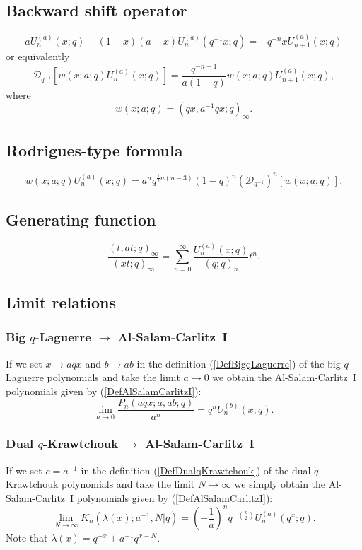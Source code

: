 \documentclass[envcountchap,graybox]{svmono}
\begin{document}
\subsection*{Backward shift operator}
\begin{equation}
\label{shift2AlSalamCarlitzI-I}
aU_n^{(a)}(x;q)-(1-x)(a-x)U_n^{(a)}(q^{-1}x;q)=-q^{-n}xU_{n+1}^{(a)}(x;q)
\end{equation}
or equivalently
\begin{equation}
\label{shift2AlSalamCarlitzI-II}
\mathcal{D}_{q^{-1}}\left[w(x;a;q)U_n^{(a)}(x;q)\right]=
\frac{q^{-n+1}}{a(1-q)}w(x;a;q)U_{n+1}^{(a)}(x;q),
\end{equation}
where
$$w(x;a;q)=(qx,a^{-1}qx;q)_{\infty}.$$

\subsection*{Rodrigues-type formula}
\begin{equation}
\label{RodAlSalamCarlitzI}
w(x;a;q)U_n^{(a)}(x;q)=a^nq^{\frac{1}{2}n(n-3)}(1-q)^n
\left(\mathcal{D}_{q^{-1}}\right)^n\left[w(x;a;q)\right].
\end{equation}

\subsection*{Generating function}
\begin{equation}
\label{GenAlSalamCarlitzI}
\frac{(t,at;q)_{\infty}}{(xt;q)_{\infty}}=
\sum_{n=0}^{\infty}\frac{U_n^{(a)}(x;q)}{(q;q)_n}t^n.
\end{equation}

\subsection*{Limit relations}

\subsubsection*{Big $q$-Laguerre $\rightarrow$ Al-Salam-Carlitz~I}
If we set $x\rightarrow aqx$ and $b\rightarrow ab$ in the definition
(\ref{DefBigqLaguerre}) of the big $q$-Laguerre polynomials and take the
limit $a\rightarrow 0$ we obtain the Al-Salam-Carlitz~I polynomials given by
(\ref{DefAlSalamCarlitzI}):
$$\lim_{a\rightarrow 0}\frac{P_n(aqx;a,ab;q)}{a^n}=q^nU_n^{(b)}(x;q).$$

\subsubsection*{Dual $q$-Krawtchouk $\rightarrow$ Al-Salam-Carlitz~I}
If we set $c=a^{-1}$ in the definition (\ref{DefDualqKrawtchouk})
of the dual $q$-Krawtchouk polynomials and take the limit
$N\rightarrow\infty$ we simply obtain the Al-Salam-Carlitz~I polynomials
given by (\ref{DefAlSalamCarlitzI}):
$$\lim_{N\rightarrow\infty}K_n(\lambda(x);a^{-1},N|q)=
\left(-\frac{1}{a}\right)^nq^{-\binom{n}{2}}U_n^{(a)}(q^x;q).$$
Note that $\lambda(x)=q^{-x}+a^{-1}q^{x-N}$.
\end{document}
